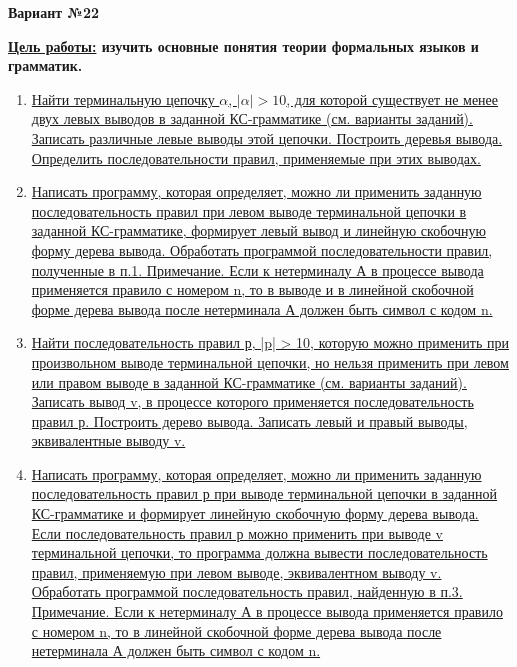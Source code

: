    \begin{center}
        {\large \textbf{Вариант №22 \\
        }}
    \end{center}

    \textbf{\underline{Цель работы:} изучить основные понятия теории формальных языков и грамматик.
    } 

    \begin{enumerate}
        \item \hyperref[sec:1]{Найти терминальную цепочку $\alpha$, $|\alpha| > 10$, для которой существует не менее двух левых выводов в заданной КС-грамматике (см. варианты
        заданий). Записать различные левые выводы этой цепочки. Построить деревья вывода. Определить последовательности правил, применяемые при этих
        выводах.}
        \item \hyperref[sec:2]{Написать программу, которая определяет, можно ли применить заданную последовательность правил при левом выводе терминальной
        цепочки в заданной КС-грамматике, формирует левый вывод и линейную скобочную форму дерева вывода. Обработать программой последовательности правил, полученные в
        п.1.
        Примечание. Если к нетерминалу А в процессе вывода применяется
        правило с номером n, то в выводе и в линейной скобочной форме дерева вывода после нетерминала А должен быть символ с кодом n.}
        \item \hyperref[sec:3]{Найти последовательность правил р, |p| > 10, которую можно применить при произвольном выводе терминальной цепочки, но нельзя
        применить при левом или правом выводе в заданной КС-грамматике
        (см. варианты заданий).
        Записать вывод v, в процессе которого применяется последовательность правил р. Построить дерево вывода.
        Записать левый и правый выводы, эквивалентные выводу v.}
        \item \hyperref[sec:4]{Написать программу, которая определяет, можно ли применить заданную последовательность правил р при выводе терминальной цепочки в заданной КС-грамматике и формирует линейную скобочную
        форму дерева вывода. Если последовательность правил р можно применить при выводе v терминальной цепочки, то программа должна вывести последовательность правил, применяемую при левом выводе,
        эквивалентном выводу v. Обработать программой последовательность правил, найденную в п.3.
        Примечание. Если к нетерминалу А в процессе вывода применяется
        правило с номером n, то в линейной скобочной форме дерева вывода
        после нетерминала А должен быть символ с кодом n.}
    \end{enumerate}